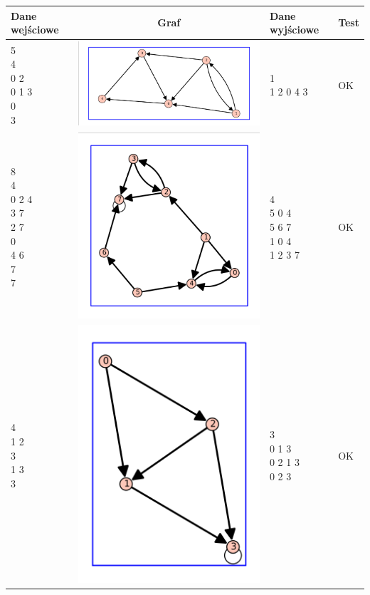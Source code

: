 \documentclass[a4paper,10pt]{article}
\begin{document}
\begin{center}
\begin{tabular}{|l|c|l|l|}\hline
{\bf Dane wejściowe}&{\bf Graf}&{\bf Dane wyjściowe}&{\bf Test}\\ \hline
\shortstack[l]{
5\\
4\\
0 2\\
0 1 3\\
0\\
3
}
&\includegraphics[width=5 cm]{sample_data5}&
\shortstack[l]{
1\\
1 2 0 4 3 
}
&OK\\ \hline

\shortstack[l]{
8\\
4\\
0 2 4\\
3 7\\
2 7\\
0\\
4 6\\
7\\
7
}
&\includegraphics[width=5 cm]{sample_data6}&
\shortstack[l]{
4\\
5 0 4\\
5 6 7\\
1 0 4\\
1 2 3 7 
}
&OK\\ \hline

\shortstack[l]{
4\\
1 2\\
3\\
1 3\\
3
}
&\includegraphics[width=3 cm]{sample_data7}&
\shortstack[l]{
3\\
0 1 3\\
0 2 1 3\\
0 2 3
}
&OK\\ \hline


\end{tabular}
\end{center}
\end{document}
